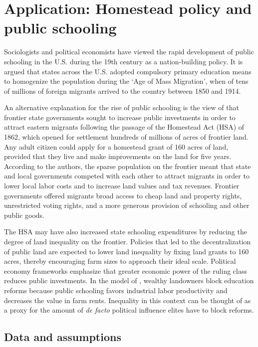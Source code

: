 \documentclass[hidelinks,12pt]{article}
\begin{document}
\section{Application: Homestead policy and public schooling} \label{schooling-app}

Sociologists and political economists \citep[e.g,][]{meyer1979public,alesina2013nation,bandiera2018nation} have viewed the rapid development of public schooling in the U.S. during the 19th century as a nation-building policy. It is argued that states across the U.S. adopted compulsory primary education means to homogenize the population during the `Age of Mass Migration', when of tens of millions of foreign migrants arrived to the country between 1850 and 1914. 

An alternative explanation for the rise of public schooling is the view of \citet{engerman2005evolution} that frontier state governments sought to increase public investments in order to attract eastern migrants following the passage of the Homestead Act (HSA) of 1862, which opened for settlement hundreds of millions of acres of frontier land. Any adult citizen could apply for a homestead grant of 160 acres of land, provided that they live and make improvements on the land for five years.  According to the authors, the sparse population on the frontier meant that state and local governments competed with each other to attract migrants in order to lower local labor costs and to increase land values and tax revenues. Frontier governments offered migrants broad access to cheap land and property rights, unrestricted voting rights, and a more generous provision of schooling and other public goods.

The HSA may have also increased state schooling expenditures by reducing the degree of land inequality on the frontier. Policies that led to the decentralization of public land are expected to lower land inequality by fixing land grants to 160 acres, thereby encouraging farm sizes to approach their ideal scale. Political economy frameworks \citep[e.g.,][]{acemoglu2008persistence, besley2009origins} emphasize that greater economic power of the ruling class reduces public investments. In the model of \citet{galor2009inequality}, wealthy landowners block education reforms because public schooling favors industrial labor productivity and decreases the value in farm rents. Inequality in this context can be thought of as a proxy for the amount of \emph{de facto} political influence elites have to block reforms.

\subsection{Data and assumptions} \label{educ-data}
\end{document}
